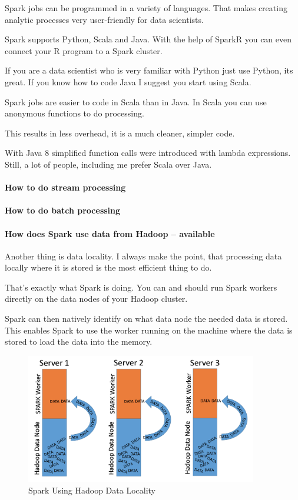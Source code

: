 \documentclass[12pt]{scrartcl} %
\begin{document}
Spark jobs can be programmed in a variety of languages. That makes creating analytic processes very user-friendly for data scientists.

Spark supports Python, Scala and Java. With the help of SparkR you can even connect your R program to a Spark cluster.

If you are a data scientist who is very familiar with Python just use Python, its great. If you know how to code Java I suggest you start using Scala.

Spark jobs are easier to code in Scala than in Java. In Scala you can use anonymous functions to do processing.

This results in less overhead, it is a much cleaner, simpler code.

With Java 8 simplified function calls were introduced with lambda expressions. Still, a lot of people, including me prefer Scala over Java.

\paragraph{How to do stream processing}
\paragraph{How to do batch processing}
\paragraph{How does Spark use data from Hadoop -- available}
Another thing is data locality. I always make the point, that processing data locally where it is stored is the most efficient thing to do.

That’s exactly what Spark is doing. You can and should run Spark workers directly on the data nodes of your Hadoop cluster.

Spark can then natively identify on what data node the needed data is stored. This enables Spark to use the worker running on the machine where the data is stored to load the data into the memory.

\begin{figure}[htbp]
  \centering
     \includegraphics[width=0.9\textwidth]{images/Spark-Data-Locality}
  \caption{Spark Using Hadoop Data Locality}
  \label{fig:Bild1}
\end{figure}
\end{document}
